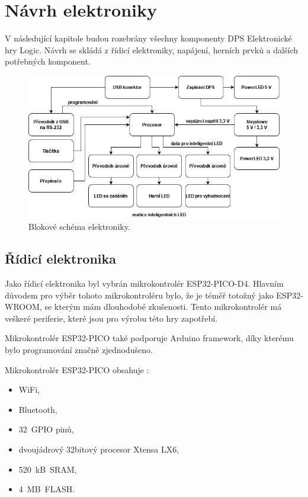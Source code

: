 \chapter{Návrh elektroniky}
V následující kapitole budou rozebrány všechny komponenty DPS Elektronické hry Logic. Návrh se skládá z řídicí elektroniky, 
napájení, herních prvků a dalších potřebných komponent.

\begin{figure}[!h]
  \begin{center}
    \includegraphics[scale=0.6]{obrazky/v2_blokove_schema.jpg}
  \end{center}
  \caption[Blokové schéma elektroniky]{Blokové schéma elektroniky.}
\end{figure}    

\section{Řídicí elektronika} \label{Ridici_elektronika}
Jako řídicí elektronika byl vybrán mikrokontrolér ESP32-PICO-D4. Hlavním důvodem pro výběr tohoto mikrokontroléru bylo, že je téměř totožný 
jako ESP32-WROOM, se 
kterým mám dlouhodobé zkušenosti. Tento mikrokontrolér má veškeré periferie, které jsou pro výrobu této hry zapotřebí. 

Mikrokontrolér ESP32-PICO také podporuje Arduino framework, díky kterému bylo programování značně zjednodušeno.

Mikrokontrolér ESP32-PICO obsahuje \cite{PICO_datasheet}: 
\begin{itemize}
    \item WiFi,
    \item Bluetooth, 
    \item 32~GPIO pinů, 
    \item dvoujádrový 32bitový procesor Xtensa LX6,
    \item 520~kB~SRAM, 
    \item 4~MB~FLASH. 
  \end{itemize}

